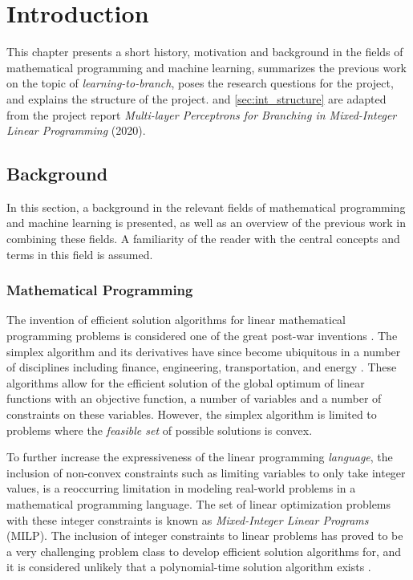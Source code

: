 \chapter{Introduction}\label{cha:introduction}
%
This chapter presents a short history, motivation and background in the fields of mathematical programming and machine learning, summarizes the previous work on the topic of \textit{learning-to-branch}, poses the research questions for the project, and explains the structure of the project.  and \ref{sec:int_structure} are adapted from the project report \textit{Multi-layer Perceptrons for Branching in Mixed-Integer Linear Programming} (2020). 


\section{Background}\label{sec:int_background}

In this section, a background in the relevant fields of mathematical programming and machine learning is presented, as well as an overview of the previous work in combining these fields. A familiarity of the reader with the central concepts and terms in this field is assumed.

\subsection{Mathematical Programming}

The invention of efficient solution algorithms for linear mathematical programming problems is considered one of the great post-war inventions \cite{dantzig1983reminiscences}. The simplex algorithm and its derivatives have since become ubiquitous in a number of disciplines including finance, engineering, transportation, and energy \cite{junger2010years}. These algorithms allow for the efficient solution of the global optimum of linear functions with an objective function, a number of variables and a number of constraints on these variables. However, the simplex algorithm is limited to problems where the \textit{feasible set} of possible solutions is convex.

To further increase the expressiveness of the linear programming \textit{language}, the inclusion of non-convex constraints such as limiting variables to only take integer values, is a reoccurring limitation in modeling real-world problems in a mathematical programming language. The set of linear optimization problems with these integer constraints is known as \textit{Mixed-Integer Linear Programs} (\gls{MILP}). The inclusion of integer constraints to linear problems has proved to be a very challenging problem class to develop efficient solution algorithms for, and it is considered unlikely that a polynomial-time solution algorithm exists \cite{bengio2020machine}.

